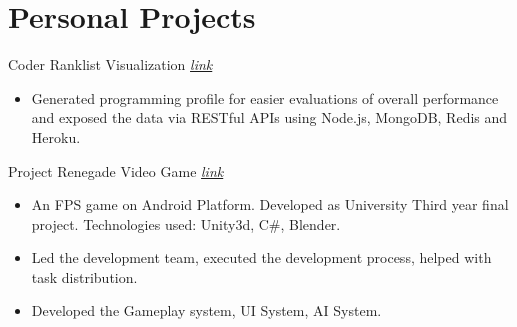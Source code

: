 \documentclass{resumestyle}
\begin{document}
\vspace{-4pt}

\section{Personal Projects}%
    
    \projectsubsection%
        {Coder Ranklist}%
        {Visualization \hfill \textit{\href{https://www.lus.ac.bd/cp__trashed/ranklist/}{\textcolor{link}{link}}}}%
    \begin{itemize}[labelsep=4pt,leftmargin=*,topsep=5pt,partopsep=0pt,itemsep=1pt]%
        \item Generated programming profile for easier evaluations of overall performance and exposed the data via RESTful APIs using Node.js, MongoDB, Redis and Heroku.
    \end{itemize}%

    \projectsubsection%
        {Project Renegade}%
        {Video Game \hfill
        \textit{\href{https://github.com/CLown1331/Unity-FPS/releases/tag/1.0.0/}{\textcolor{link}{link}}}}%
    \begin{itemize}[labelsep=4pt,leftmargin=*,topsep=5pt,partopsep=0pt,itemsep=1pt]%
        \item An FPS game on Android Platform. Developed as University Third year final project. Technologies used: Unity3d, C\#, Blender.
        \item Led the development team, executed the development process, helped with task distribution.
        \item Developed the Gameplay system, UI System, AI System.
    \end{itemize}%
\end{document}
